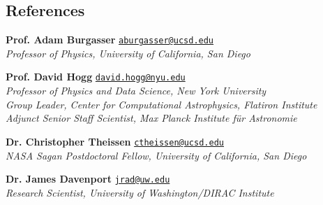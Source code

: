 \documentclass[margin,line]{resume}
\newcommand{\tab}[1]{\hspace{.2667\textwidth}\rlap{#1}}
\newcommand{\itab}[1]{\hspace{0em}\rlap{#1}}
\begin{document}
\begin{resume}



\section{\mysidestyle \textcolor{bcolor}{References}}
\textbf{Prof. Adam Burgasser} \hfill {\tt \href{aburgasser@ucsd.edu}{aburgasser@ucsd.edu}} \\
\-\hspace{.25cm} \textit{Professor of Physics, University of California, San Diego} 

\textbf{Prof. David Hogg} \hfill {\tt \href{david.hogg@nyu.edu}{david.hogg@nyu.edu}} \\
\-\hspace{.25cm} \textit{Professor of Physics and Data Science, New York University} \\
\-\hspace{.25cm} \textit{Group Leader, Center for Computational Astrophysics, Flatiron Institute} \\
\-\hspace{.25cm} \textit{Adjunct Senior Staff Scientist, Max Planck Institute f{\"u}r Astronomie} 

\textbf{Dr. Christopher Theissen} \hfill {\tt \href{ctheissen@ucsd.edu}{ctheissen@ucsd.edu}} \\
\-\hspace{.25cm} \textit{NASA Sagan Postdoctoral Fellow, University of California, San Diego} 

\textbf{Dr. James Davenport} \hfill {\tt \href{jrad@uw.edu}{jrad@uw.edu}} \\
\-\hspace{.25cm} \textit{Research Scientist, University of Washington/DIRAC Institute} 
 	       
\end{resume}   
\end{document}
